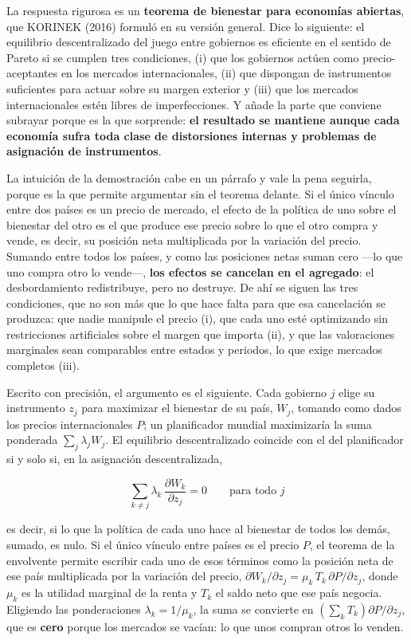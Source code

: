 \documentclass[10pt,a4paper]{article}
\begin{document}
La respuesta rigurosa es un \textbf{teorema de bienestar para economías abiertas}, que KORINEK (2016) formuló en su versión general. Dice lo siguiente: el equilibrio descentralizado del juego entre gobiernos es eficiente en el sentido de Pareto si se cumplen tres condiciones, (i) que los gobiernos actúen como precio-aceptantes en los mercados internacionales, (ii) que dispongan de instrumentos suficientes para actuar sobre su margen exterior y (iii) que los mercados internacionales estén libres de imperfecciones. Y añade la parte que conviene subrayar porque es la que sorprende: \textbf{el resultado se mantiene aunque cada economía sufra toda clase de distorsiones internas y problemas de asignación de instrumentos}.

La intuición de la demostración cabe en un párrafo y vale la pena seguirla, porque es la que permite argumentar sin el teorema delante. Si el único vínculo entre dos países es un precio de mercado, el efecto de la política de uno sobre el bienestar del otro es el que produce ese precio sobre lo que el otro compra y vende, es decir, su posición neta multiplicada por la variación del precio. Sumando entre todos los países, y como las posiciones netas suman cero —lo que uno compra otro lo vende—, \textbf{los efectos se cancelan en el agregado}: el desbordamiento redistribuye, pero no destruye. De ahí se siguen las tres condiciones, que no son más que lo que hace falta para que esa cancelación se produzca: que nadie manipule el precio (i), que cada uno esté optimizando sin restricciones artificiales sobre el margen que importa (ii), y que las valoraciones marginales sean comparables entre estados y periodos, lo que exige mercados completos (iii).

Escrito con precisión, el argumento es el siguiente. Cada gobierno $j$ elige su instrumento $z_j$ para maximizar el bienestar de su país, $W_j$, tomando como dados los precios internacionales $P$; un planificador mundial maximizaría la suma ponderada $\sum_j\lambda_j W_j$. El equilibrio descentralizado coincide con el del planificador si y solo si, en la asignación descentralizada,

$$\sum_{k\neq j}\lambda_k\,\frac{\partial W_k}{\partial z_j}=0\qquad\text{para todo }j$$

es decir, si lo que la política de cada uno hace al bienestar de todos los demás, sumado, es nulo. Si el único vínculo entre países es el precio $P$, el teorema de la envolvente permite escribir cada uno de esos términos como la posición neta de ese país multiplicada por la variación del precio, $\partial W_k/\partial z_j=\mu_k\,T_k\,\partial P/\partial z_j$, donde $\mu_k$ es la utilidad marginal de la renta y $T_k$ el saldo neto que ese país negocia. Eligiendo las ponderaciones $\lambda_k=1/\mu_k$, la suma se convierte en $\left(\sum_k T_k\right)\partial P/\partial z_j$, que es \textbf{cero} porque los mercados se vacían: lo que unos compran otros lo venden.
\end{document}
